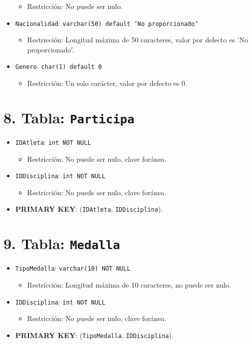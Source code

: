 \begin{itemize}
    \begin{itemize}
        \item Restricción: No puede ser nulo.
    \end{itemize}
    \item \texttt{Nacionalidad}: \texttt{varchar(50) default 'No proporcionado'}
    \begin{itemize}
        \item Restricción: Longitud máxima de 50 caracteres, valor por defecto es 'No proporcionado'.
    \end{itemize}
    \item \texttt{Genero}: \texttt{char(1) default 0}
    \begin{itemize}
        \item Restricción: Un solo carácter, valor por defecto es 0.
    \end{itemize}
\end{itemize}

\section*{8. Tabla: \texttt{Participa}}
\begin{itemize}
    \item \texttt{IDAtleta}: \texttt{int NOT NULL}
    \begin{itemize}
        \item Restricción: No puede ser nulo, clave foránea.
    \end{itemize}
    \item \texttt{IDDisciplina}: \texttt{int NOT NULL}
    \begin{itemize}
        \item Restricción: No puede ser nulo, clave foránea.
    \end{itemize}
    \item \textbf{PRIMARY KEY}: (\texttt{IDAtleta}, \texttt{IDDisciplina}).
\end{itemize}

\section*{9. Tabla: \texttt{Medalla}}
\begin{itemize}
    \item \texttt{TipoMedalla}: \texttt{varchar(10) NOT NULL}
    \begin{itemize}
        \item Restricción: Longitud máxima de 10 caracteres, no puede ser nulo.
    \end{itemize}
    \item \texttt{IDDisciplina}: \texttt{int NOT NULL}
    \begin{itemize}
        \item Restricción: No puede ser nulo, clave foránea.
    \end{itemize}
    \item \textbf{PRIMARY KEY}: (\texttt{TipoMedalla}, \texttt{IDDisciplina}).
\end{itemize}

